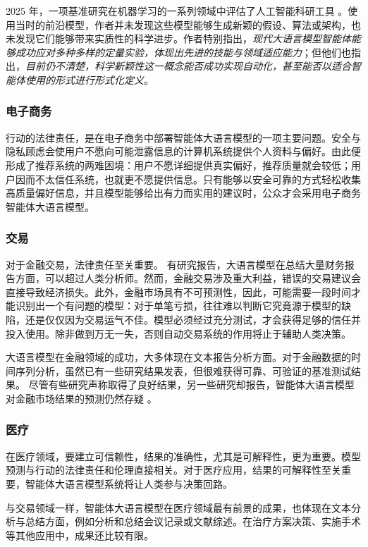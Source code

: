 2025 年，一项基准研究在机器学习的一系列领域中评估了人工智能科研工具 \citep{nathani2025mlgym}。使用当时的前沿模型，作者并未发现这些模型能够生成新颖的假设、算法或架构，也未发现它们能够带来实质性的科学进步。作者特别指出，{\em 现代大语言模型智能体能够成功应对多种多样的定量实验，体现出先进的技能与领域适应能力}；但他们也指出，{\em 目前仍不清楚，科学新颖性这一概念能否成功实现自动化，甚至能否以适合智能体使用的形式进行形式化定义}。



\subsubsection{电子商务}
行动的法律责任，是在电子商务中部署智能体大语言模型的一项主要问题。安全与隐私顾虑会使用户不愿向可能泄露信息的计算机系统提供个人资料与偏好。由此便形成了推荐系统的两难困境：用户不愿详细提供真实偏好，推荐质量就会较低；用户因而不太信任系统，也就更不愿提供信息。只有能够以安全可靠的方式轻松收集高质量偏好信息，并且模型能够给出有力而实用的建议时，公众才会采用电子商务智能体大语言模型。

\subsubsection{交易}
对于金融交易，法律责任至关重要。
有研究报告，大语言模型在总结大量财务报告方面，可以超过人类分析师。然而，金融交易涉及重大利益，错误的交易建议会直接导致经济损失。此外，金融市场具有不可预测性，因此，可能需要一段时间才能识别出一个有问题的模型：对于单笔亏损，往往难以判断它究竟源于模型的缺陷，还是仅仅因为交易运气不佳。模型必须经过充分测试，才会获得足够的信任并投入使用。除非做到万无一失，否则自动交易系统的作用将止于辅助人类决策。

大语言模型在金融领域的成功，大多体现在文本报告分析方面。对于金融数据的时间序列分析，虽然已有一些研究结果发表，但很难获得可靠、可验证的基准测试结果。
尽管有些研究声称取得了良好结果，另一些研究却报告，智能体大语言模型对金融市场结果的预测仍然存疑 \citep{li2026can}。




\subsubsection{医疗}
在医疗领域，要建立可信赖性，结果的准确性，尤其是可解释性，更为重要。模型预测与行动的法律责任和伦理直接相关。对于医疗应用，结果的可解释性至关重要，智能体大语言模型系统将让人类参与决策回路。

与交易领域一样，智能体大语言模型在医疗领域最有前景的成果，也体现在文本分析与总结方面，例如分析和总结会议记录或文献综述。在治疗方案决策、实施手术等其他应用中，成果还比较有限。

